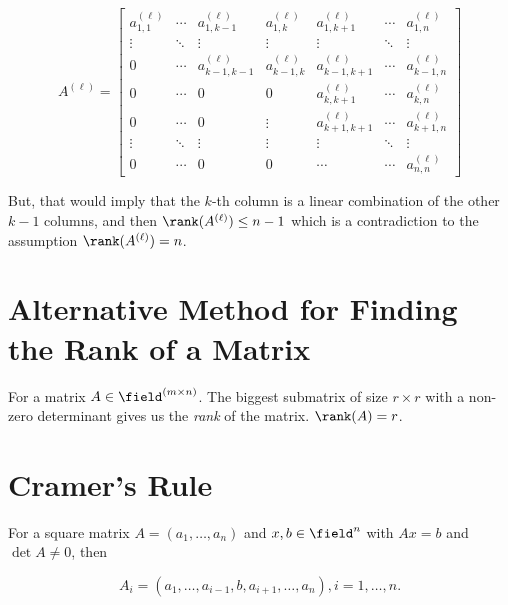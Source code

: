 \[
    A^{(\ell)} =
    \begin{bmatrix}
        a^{(\ell)}_{1,1} & \cdots & a^{(\ell)}_{1,k-1}   & a^{(\ell)}_{1,k}    & a^{(\ell)}_{1,k+1}   & \cdots & a^{(\ell)}_{1,n}    \\
        \vdots          & \ddots & \vdots               & \vdots             & \vdots               & \ddots & \vdots             \\
        0               & \cdots & a^{(\ell)}_{k-1,k-1} & a^{(\ell)}_{k-1,k} & a^{(\ell)}_{k-1,k+1} & \cdots & a^{(\ell)}_{k-1,n} \\
        0               & \cdots & 0                    & 0                  & a^{(\ell)}_{k,k+1}   & \cdots & a^{(\ell)}_{k,n}    \\
        0               & \cdots & 0                    & \vdots             & a^{(\ell)}_{k+1,k+1} & \cdots & a^{(\ell)}_{k+1,n} \\
        \vdots          & \ddots & \vdots               & \vdots             & \vdots               & \ddots & \vdots             \\
        0               & \cdots & 0                    & 0                  & \cdots               & \cdots & a^{(\ell)}_{n,n}
    \end{bmatrix}
\]

But, that would imply that the \(k\)-th column is a linear combination of the other \(k - 1\) columns,
and then \(\rank(A^{(\ell)}) \le n - 1\) which is a contradiction to the assumption \(\rank(A^{(\ell)}) = n\).

\QED

\section{Alternative Method for Finding the Rank of a Matrix}

For a matrix \(A \in \field^{(m \times n)}\). The biggest submatrix of size \(r \times r\) with a
non-zero determinant gives us the \emph{rank} of the matrix. \(\rank(A) = r\).

\section{Cramer's Rule}

For a square matrix \(A = (a_1, \dots, a_n)\) and \(x,b \in \field^{n}\) with \(Ax = b\) and \(\det A \ne 0\),
then

\[
    A_i = (a_1, \dots, a_{i - 1}, b, a_{i + 1}, \dots, a_n), i = 1,\dots,n.
\]

